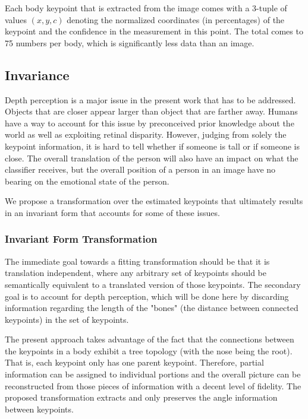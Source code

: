 \documentclass{article}
\begin{document}
Each body keypoint that is extracted from the image comes with a 3-tuple of values $(x,y,c)$ denoting the normalized coordinates (in percentages) of the keypoint and the confidence in the measurement in this point. The total comes to 75 numbers per body, which is significantly less data than an image.

\subsection{Invariance}
Depth perception is a major issue in the present work that has to be addressed. Objects that are closer appear larger than object that are farther away. Humans have a way to account for this issue by preconceived prior knowledge about the world as well as exploiting retinal disparity. However, judging from solely the keypoint information, it is hard to tell whether if someone is tall or if someone is close. The overall translation of the person will also have an impact on what the classifier receives, but the overall position of a person in an image have no bearing on the emotional state of the person.

We propose a transformation over the estimated keypoints that ultimately results in an invariant form that accounts for some of these issues.

\subsubsection{Invariant Form Transformation}

The immediate goal towards a fitting transformation should be that it is translation independent, where any arbitrary set of keypoints should be semantically equivalent to a translated version of those keypoints. The secondary goal is to account for depth perception, which will be done here by discarding information regarding the length of the "bones" (the distance between connected keypoints) in the set of keypoints.

The present approach takes advantage of the fact that the connections between the keypoints in a body exhibit a tree topology (with the nose being the root). That is, each keypoint only has one parent keypoint. Therefore, partial information can be assigned to individual portions and the overall picture can be reconstructed from those pieces of information with a decent level of fidelity. The proposed transformation extracts and only preserves the angle information between keypoints.
\end{document}
